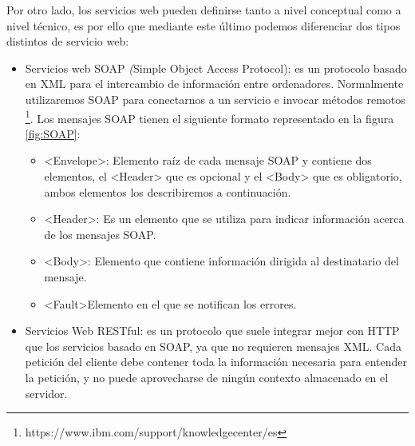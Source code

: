 Por otro lado, los servicios web pueden definirse tanto a nivel conceptual como a nivel técnico, es por ello que mediante este último podemos diferenciar dos tipos distintos de servicio web:
\begin{itemize}
	\item Servicios web SOAP  \textit({Simple Object Access Protocol}): es un protocolo basado en XML para el intercambio de información entre ordenadores. Normalmente utilizaremos SOAP para conectarnos a un servicio e invocar métodos remotos 
	\footnote{https://www.ibm.com/support/knowledgecenter/es}. Los mensajes SOAP tienen el siguiente formato representado en la figura \ref{fig:SOAP}:

	
	\begin{itemize}
		\item <Envelope>: Elemento raíz de cada mensaje SOAP y contiene dos elementos, el <Header> que es opcional y el <Body> que es obligatorio, ambos elementos los describiremos a continuación.
		\item <Header>: Es un elemento que se utiliza para indicar información acerca de los mensajes SOAP.
		\item <Body>: Elemento que contiene información dirigida al destinatario del mensaje.
		\item <Fault>Elemento en el que se notifican los errores.
			
	\end{itemize}

	\item Servicios Web RESTful: es un protocolo que suele integrar mejor con HTTP que los servicios basado en SOAP, ya que no requieren mensajes XML. Cada petición del cliente debe contener toda la información necesaria para entender la petición, y no puede aprovecharse de ningún contexto almacenado en el servidor.
	
\end{itemize}
